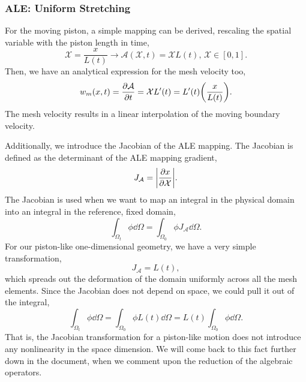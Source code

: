 \documentclass[../../thesis.tex]{subfiles}
\newcommand{\alemap}{\ensuremath{\mathcal{A}}}
\newcommand{\aleX}{\ensuremath{\mathcal{X}}}
\begin{document}
\subsubsection{ALE: Uniform Stretching}
\label{sec:ale_uniform_stretching}
For the moving piston, a simple mapping can be derived, 
rescaling the spatial variable with the piston length in time,
\begin{equation}
    \aleX = \frac{x}{L(t)} \rightarrow \alemap(\aleX, t) = \aleX L(t), \, \aleX \in [0,1].
\end{equation}
Then, we have an analytical expression for the mesh velocity too,
\begin{equation}
    w_m(x,t) = \pdv{\alemap}{t} = \aleX L'(t) = L'(t) \qty(\frac{x}{L(t)}).
\end{equation}
The mesh velocity results in a linear interpolation 
of the moving boundary velocity.

Additionally, we introduce the Jacobian of the ALE mapping. 
The Jacobian is defined as the determinant of the ALE mapping gradient,
\begin{equation}
    J_{\alemap} = \qty|\pdv{x}{\aleX}|.
    \label{eq:Jacobian}
\end{equation}
The Jacobian is used when we want to map an integral in the physical domain
into an integral in the reference, fixed domain,
\begin{equation}
    \int_{\Omega_t} \phi \dd \Omega = \int_{\Omega_0} \phi J_{\alemap} \dd \Omega.
    \label{eq:jacobian_integral_transformation}
\end{equation}
For our piston-like one-dimensional geometry, we have a very simple transformation,
\begin{equation}
    J_{\alemap} = L(t),
    \label{eq:jacobian_trivial}
\end{equation}
which spreads out the deformation of the domain uniformly across all the mesh elements.
Since the Jacobian does not depend on space,
we could pull it out of the integral, 
\begin{equation}
    \int_{\Omega_t} \phi \dd \Omega 
    = 
    \int_{\Omega_0} \phi L(t) \dd \Omega
    =
    L(t) \int_{\Omega_0} \phi \dd \Omega.
    \label{eq:jacobian_pulled_out_integral}
\end{equation}
That is, the Jacobian transformation for a piston-like motion 
does not introduce any nonlinearity in the space dimension. 
We will come back to this fact further down in the document,
when we comment upon the reduction of the algebraic operators.
\end{document}
